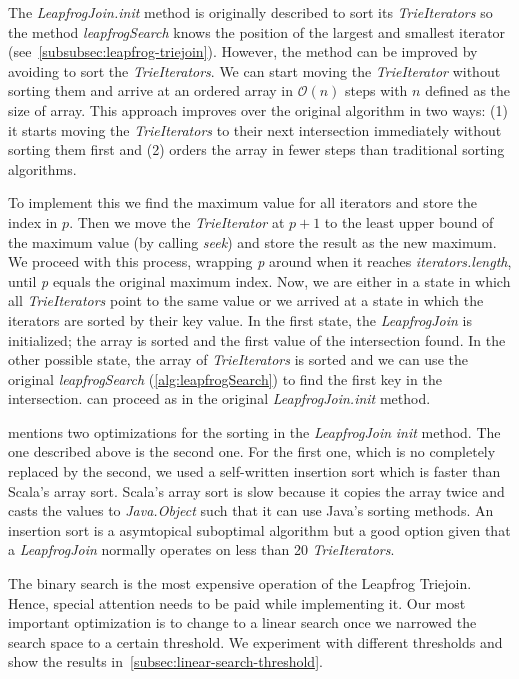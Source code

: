 The \textit{LeapfrogJoin.init} method is originally described to sort its \textit{TrieIterators} so the method
\textit{leapfrogSearch} knows the position of the largest and smallest iterator (see~\cref{subsubsec:leapfrog-triejoin}).
However, the method can be improved by avoiding to sort the \textit{TrieIterators}.
We can start moving the \textit{TrieIterator} without sorting them and arrive at an ordered array in $\mathcal{O} (n)$ steps with $n$
defined as the size of array.
This approach improves over the original algorithm in two ways: (1) it starts moving the \textit{TrieIterators} to their next intersection
immediately without sorting them first and
(2) orders the array in fewer steps than traditional sorting algorithms.

To implement this we find the maximum value for  all iterators and store the index in $p$.
Then we move the \textit{TrieIterator} at $p + 1$ to the least upper bound of the maximum value (by calling \textit{seek}) and store the
result as the new maximum.
We proceed with this process, wrapping \textit{p} around when it reaches \textit{iterators.length}, until \textit{p} equals the original
maximum index.
Now, we are either in a state in which all \textit{TrieIterators} point to the same value or we arrived at a state in which the iterators
are sorted by their key value.
In the first state, the \textit{LeapfrogJoin} is initialized;
the array is sorted and the first value of the intersection found.
In the other possible state, the array of \textit{TrieIterators} is sorted and we can use the original \textit{leapfrogSearch}
(\cref{alg:leapfrogSearch}) to find the first key in the intersection.
can proceed as in the original \textit{LeapfrogJoin.init} method.

 mentions two optimizations for the sorting in the \textit{LeapfrogJoin} \textit{init} method.
The one described above is the second one.
For the first one, which is no completely replaced by the second, we used a self-written insertion sort which is faster than
Scala's array sort.
Scala's array sort is slow because it copies the array twice and casts the values to \textit{Java.Object} such that it can use Java's
sorting methods.
An insertion sort is a asymtopical suboptimal algorithm but a good option given that a \textit{LeapfrogJoin} normally operates on less
than 20 \textit{TrieIterators}.

The binary search is the most expensive operation of the Leapfrog Triejoin.
Hence, special attention needs to be paid while implementing it.
Our most important optimization is to change to a linear search once we narrowed the search space
to a certain threshold.
We experiment with different thresholds and show the results in~\cref{subsec:linear-search-threshold}.

